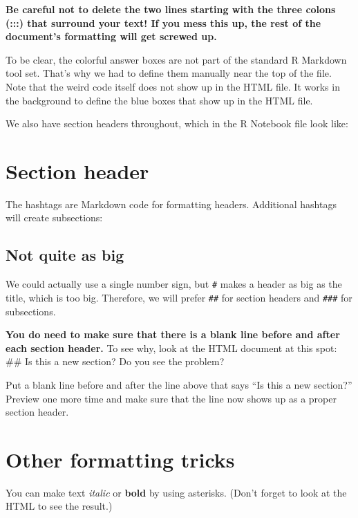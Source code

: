 \documentclass[
]{book}
\begin{document}
\textbf{Be careful not to delete the two lines starting with the three colons (:::) that surround your text! If you mess this up, the rest of the document's formatting will get screwed up.}

To be clear, the colorful answer boxes are not part of the standard R Markdown tool set. That's why we had to define them manually near the top of the file. Note that the weird code itself does not show up in the HTML file. It works in the background to define the blue boxes that show up in the HTML file.

We also have section headers throughout, which in the R Notebook file look like:

\hypertarget{section-header}{%
\section*{Section header}\label{section-header}}

The hashtags are Markdown code for formatting headers. Additional hashtags will create subsections:

\hypertarget{not-quite-as-big}{%
\subsection*{Not quite as big}\label{not-quite-as-big}}

We could actually use a single number sign, but \texttt{\#} makes a header as big as the title, which is too big. Therefore, we will prefer \texttt{\#\#} for section headers and \texttt{\#\#\#} for subsections.

\textbf{You do need to make sure that there is a blank line before and after each section header.} To see why, look at the HTML document at this spot:
\#\# Is this a new section?
Do you see the problem?

Put a blank line before and after the line above that says ``Is this a new section?'' Preview one more time and make sure that the line now shows up as a proper section header.

\hypertarget{rmark-othertricks}{%
\section{Other formatting tricks}\label{rmark-othertricks}}

You can make text \emph{italic} or \textbf{bold} by using asterisks. (Don't forget to look at the HTML to see the result.)
\end{document}
